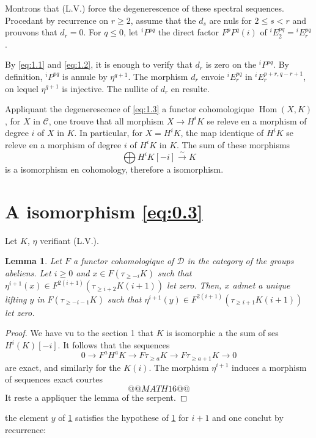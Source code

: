 \documentclass[11pt,a4paper]{article}
\theoremstyle{plain}
\newtheorem{lemma}[theorem]{Lemma}
\theoremstyle{definition}
\DeclareMathOperator{\Hom}{Hom}
\newcommand{\cD}{\mathscr{D}}
\newcommand{\cC}{\mathscr{C}}
\begin{document}
Montrons that (L.V.) force the degenerescence of these spectral sequences. Procedant by recurrence on $r \geqslant 2$, assume that the $d_s$ are nuls for $2 \leqslant s < r$ and prouvons that $d_r = 0$. For $q \leqslant 0$, let ${}^i\!P^{pq}$ the direct factor $F^p P^q(i)$ of ${}^i\!E_2^{pq} = {}^i\!E_r^{pq}$.

By \eqref{eq:1.1} and \eqref{eq:1.2}, it is enough to verify that $d_r$ is zero on the ${}^i\!P^{pq}$. By definition, ${}^i\!P^{pq}$ is annule by $\eta^{q+1}$. The morphism $d_r$ envoie ${}^i\!E_r^{pq}$ in ${}^i\!E_r^{p+r,q-r+1}$, on lequel $\eta^{q+1}$ is injective. The nullite of $d_r$ en resulte.

Appliquant the degenerescence of \eqref{eq:1.3} a functor cohomologique $\Hom(X,K)$, for $X$ in $\cC$, one trouve that all morphism $X \to H^i K$ se releve en a morphism of degree $i$ of $X$ in $K$. In particular, for $X = H^i K$, the map identique of $H^i K$ se releve en a morphism of degree $i$ of $H^i K$ in $K$. The sum of these morphisms
\[
\bigoplus H^i K[-i] \xrightarrow{\sim} K
\]
is a isomorphism en cohomology, therefore a isomorphism.

\section{A isomorphism \eqref{eq:0.3}}

Let $K$, $\eta$ verifiant (L.V.).

\begin{lemma}\label{lem:2.1}
Let $F$ a functor cohomologique of $\cD$ in the category of the groups abeliens. Let $i \geqslant 0$ and $x \in F(\tau_{\geqslant -i} K)$ such that $\eta^{i+1}(x) \in F^{2(i+1)}(\tau_{\geqslant i+2} K(i+1))$ let zero. Then, $x$ admet a unique lifting $y$ in $F(\tau_{\geqslant -i-1} K)$ such that $\eta^{i+1}(y) \in F^{2(i+1)}(\tau_{\geqslant i+1} K(i+1))$ let zero.
\end{lemma}

\begin{proof}
We have vu to the section 1 that $K$ is isomorphic a the sum of ses $H^i(K)[-i]$. It follows that the sequences
\[
0 \to F^a H^a K \to F \tau_{\geqslant a} K \to F \tau_{\geqslant a+1} K \to 0
\]
are exact, and similarly for the $K(i)$. The morphism $\eta^{i+1}$ induces a morphism of sequences exact courtes
\[
@@MATH16@@
\]
It reste a appliquer the lemma of the serpent.
\end{proof}

the element $y$ of \ref{lem:2.1} satisfies the hypothese of \ref{lem:2.1} for $i+1$ and one conclut by recurrence:
\end{document}

